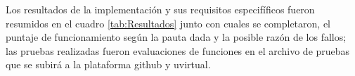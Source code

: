 Los resultados de la implementación y sus requisitos especifíficos fueron resumidos 
en el cuadro \ref{tab:Resultados} junto con cuales se completaron, el puntaje de 
funcionamiento según la pauta dada y la posible razón de los fallos; las pruebas 
realizadas fueron evaluaciones de funciones en el archivo de pruebas que se subirá 
a la plataforma github y uvirtual.